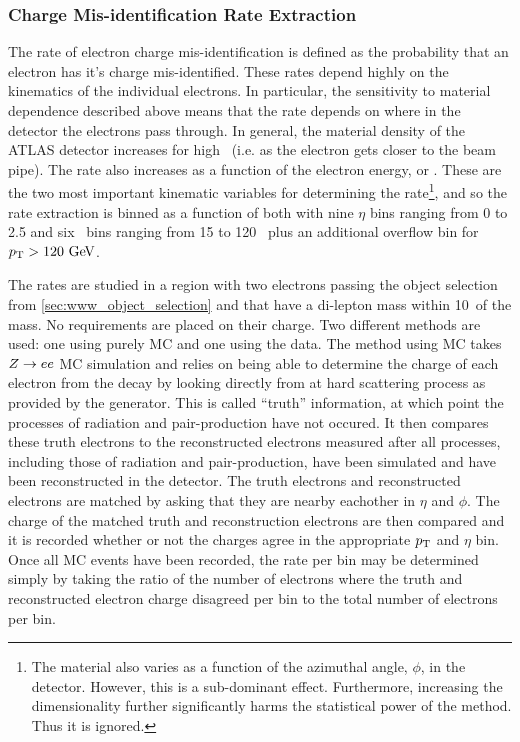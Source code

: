 \subsubsection{Charge Mis-identification Rate Extraction}

The rate of electron charge mis-identification is defined as 
the probability that an electron has it's charge mis-identified.
These rates depend highly on the kinematics of the individual electrons.
In particular, the sensitivity to material dependence described above 
means that the rate depends on where in the detector the electrons
pass through. In general, the material density of the ATLAS
detector increases for high \eta~(i.e. as the electron gets closer to the
beam pipe). The rate also increases as a function of the electron energy, 
or \pt. These are the two most important kinematic variables for determining
the rate\footnote{The material also varies as a function of the azimuthal angle,
$\phi$, in the detector. However, this is a sub-dominant effect. Furthermore,
increasing the dimensionality further significantly harms the statistical 
power of the method. Thus it is ignored.}, and 
so the rate extraction is binned as a function of both with nine $\eta$ 
bins ranging from 0 to 2.5 and six \pt~bins ranging from 15 to 120 \GeV~plus
an additional overflow bin for $\pt>120\GeV$.



The rates are studied in a region with two electrons passing the object
selection from \sec\ref{sec:www_object_selection} and that have
a di-lepton mass within 10~\GeV of the \z mass. No requirements are placed
on their charge. Two different methods
are used: one using purely MC and one using the data.
The method using MC takes $Z\rightarrow ee$ MC simulation 
and relies on being able to determine the charge of each electron from the 
\z decay by looking 
directly from at hard scattering process as provided by the generator.
This is called ``truth'' information, at which point the processes of radiation
and pair-production have not occured. It then compares
these truth electrons to the reconstructed electrons 
measured after all processes, including those of radiation and pair-production,
have been simulated and have been reconstructed
in the detector. The truth electrons and reconstructed electrons
are matched by asking that they are nearby eachother in $\eta$ and $\phi$.
The charge of the matched truth and reconstruction electrons 
are then compared and it is recorded whether or not the charges agree
in the appropriate $p_{\mathrm{T}}$ and $\eta$ bin. Once all MC events
have been recorded, the rate per bin may be determined simply 
by taking the ratio of the number of electrons where the truth and reconstructed
electron charge disagreed per bin to the total number of electrons per bin. 

